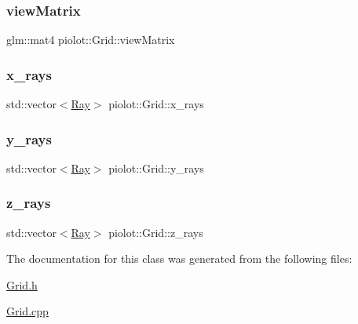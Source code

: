 \subsubsection{\texorpdfstring{view\+Matrix}{viewMatrix}}
{\footnotesize\ttfamily glm\+::mat4 piolot\+::\+Grid\+::view\+Matrix}

\mbox{\label{classpiolot_1_1_grid_a09e5317cee1cd166c91363d608bde97d}} 
\subsubsection{\texorpdfstring{x\+\_\+rays}{x\_rays}}
{\footnotesize\ttfamily std\+::vector$<$\mbox{\hyperlink{classpiolot_1_1_ray}{Ray}}$>$ piolot\+::\+Grid\+::x\+\_\+rays}

\mbox{\label{classpiolot_1_1_grid_a8eaf3716e1f5623d15fa26cf1e8b2778}} 
\subsubsection{\texorpdfstring{y\+\_\+rays}{y\_rays}}
{\footnotesize\ttfamily std\+::vector$<$\mbox{\hyperlink{classpiolot_1_1_ray}{Ray}}$>$ piolot\+::\+Grid\+::y\+\_\+rays}

\mbox{\label{classpiolot_1_1_grid_a9407fb2aa26aae50604cd8d8197d3fb6}} 
\subsubsection{\texorpdfstring{z\+\_\+rays}{z\_rays}}
{\footnotesize\ttfamily std\+::vector$<$\mbox{\hyperlink{classpiolot_1_1_ray}{Ray}}$>$ piolot\+::\+Grid\+::z\+\_\+rays}



The documentation for this class was generated from the following files\+:\begin{DoxyCompactItemize}
\item 
\mbox{\hyperlink{_grid_8h}{Grid.\+h}}\item 
\mbox{\hyperlink{_grid_8cpp}{Grid.\+cpp}}\end{DoxyCompactItemize}

